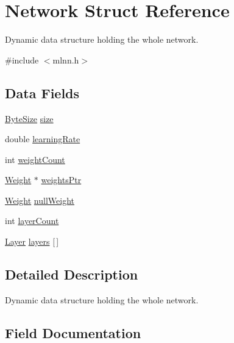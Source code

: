 \hypertarget{struct_network}{}\section{Network Struct Reference}
\label{struct_network}


Dynamic data structure holding the whole network.  




{\ttfamily \#include $<$mlnn.\+h$>$}

\subsection*{Data Fields}
\begin{DoxyCompactItemize}
\item 
\hyperlink{mlnn_8h_a7a4b57eb083e961719b18441711d8ee5}{Byte\+Size} \hyperlink{struct_network_aab34baa6cb3e7bebfb7f4ba88a0ffbda}{size}
\item 
double \hyperlink{struct_network_a53a924d5fb6cef4d4ff8663ed8de41e0}{learning\+Rate}
\item 
int \hyperlink{struct_network_a5a4f83fb87de35074deea4b2376c9268}{weight\+Count}
\item 
\hyperlink{mlnn_8h_a5b53e5716aeadbb040a52c9c8c124c74}{Weight} $\ast$ \hyperlink{struct_network_aba0c89d93d01078126869da17a931b5b}{weights\+Ptr}
\item 
\hyperlink{mlnn_8h_a5b53e5716aeadbb040a52c9c8c124c74}{Weight} \hyperlink{struct_network_a3ab26aa9d5b854a960c4e6b1d05eca98}{null\+Weight}
\item 
int \hyperlink{struct_network_a3e69185f25b7b306dd5fca9ecaeab1ec}{layer\+Count}
\item 
\hyperlink{struct_layer}{Layer} \hyperlink{struct_network_acc1dc774ad9dc21d629d6842ad5a4631}{layers} \mbox{[}$\,$\mbox{]}
\end{DoxyCompactItemize}


\subsection{Detailed Description}
Dynamic data structure holding the whole network. 

\subsection{Field Documentation}
\hypertarget{struct_network_a3e69185f25b7b306dd5fca9ecaeab1ec}{}
